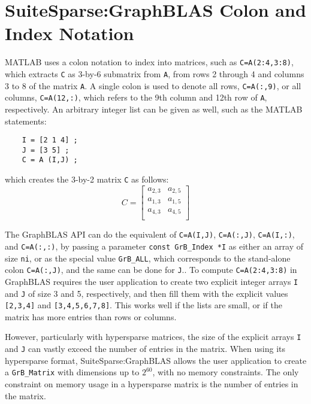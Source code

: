\documentclass[12pt]{article}
\begin{document}
\newpage
\section{SuiteSparse:GraphBLAS Colon and Index Notation} %
\label{colon}

MATLAB uses a colon notation to index into matrices, such as
\verb'C=A(2:4,3:8)', which extracts \verb'C' as 3-by-6 submatrix from \verb'A',
from rows 2 through 4 and columns 3 to 8 of the matrix \verb'A'.  A single
colon is used to denote all rows, \verb'C=A(:,9)', or all columns,
\verb'C=A(12,:)', which refers to the 9th column and 12th row of \verb'A',
respectively.  An arbitrary integer list can be given as well, such as the
MATLAB statements:

    {\footnotesize
    \begin{verbatim}
    I = [2 1 4] ;
    J = [3 5] ;
    C = A (I,J) ; \end{verbatim} }
\noindent
which creates the 3-by-2 matrix \verb'C' as follows:
\[
C =
\left[
\begin{array}{cc}
a_{2,3} & a_{2,5} \\
a_{1,3} & a_{1,5} \\
a_{4,3} & a_{4,5} \\
\end{array}
\right]
\]

The GraphBLAS API can do the equivalent of \verb'C=A(I,J)',
\verb'C=A(:,J)', \verb'C=A(I,:)', and \verb'C=A(:,:)', by passing a parameter
\verb'const GrB_Index *I' as either an array of size \verb'ni', or as the
special value \verb'GrB_ALL', which corresponds to the stand-alone colon
\verb'C=A(:,J)', and the same can be done for \verb'J'..  To compute
\verb'C=A(2:4,3:8)' in GraphBLAS requires the user application to create two
explicit integer arrays \verb'I' and \verb'J' of size 3 and 5, respectively,
and then fill them with the explicit values \verb'[2,3,4]' and
\verb'[3,4,5,6,7,8]'.  This works well if the lists are small, or if the matrix
has more entries than rows or columns.

However, particularly with hypersparse matrices, the size of the explicit
arrays \verb'I' and \verb'J' can vastly exceed the number of entries in the
matrix.  When using its hypersparse format, SuiteSparse:GraphBLAS allows the
user application to create a \verb'GrB_Matrix' with dimensions up to $2^{60}$,
with no memory constraints.  The only constraint on memory usage in a
hypersparse matrix is the number of entries in the matrix.
\end{document}
